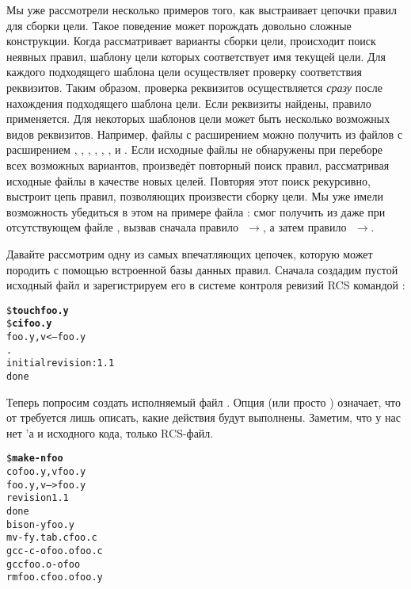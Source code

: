 Мы уже рассмотрели несколько примеров того, как \GNUmake{} выстраивает
цепочки правил для сборки цели. Такое поведение может порождать
довольно сложные конструкции. Когда \GNUmake{} рассматривает варианты
сборки цели, происходит поиск неявных правил, шаблону цели которых
соответствует имя текущей цели. Для каждого подходящего шаблона цели
\GNUmake{} осуществляет проверку соответствия реквизитов. Таким
образом, проверка реквизитов осуществляется \emph{сразу} после
нахождения подходящего шаблона цели. Если реквизиты найдены, правило
применяется. Для некоторых шаблонов цели может быть несколько
возможных видов реквизитов. Например, файлы с расширением
 можно получить из файлов с расширением ,
, , , ,
,  и . Если исходные файлы не
обнаружены при переборе всех возможных вариантов, \GNUmake{}
произведёт повторный поиск правил, рассматривая исходные файлы в
качестве новых целей. Повторяя этот поиск рекурсивно, \GNUmake{}
выстроит цепь правил, позволяющих произвести сборку цели. Мы уже имели
возможность убедиться в этом на примере файла :
\GNUmake{} смог получить  из  даже
при отсутствующем файле , вызвав сначала правило
$\,\,\rightarrow{}$, а затем правило
$\,\,\rightarrow{}$.

Давайте рассмотрим одну из самых впечатляющих цепочек, которую
\GNUmake{} может породить с помощью встроенной базы данных правил.
Сначала создадим пустой исходный файл  и зарегистрируем
его в системе контроля ревизий RCS командой :

\begin{alltt}
\footnotesize
\$ \textbf{touch foo.y}
\$ \textbf{ci foo.y}
foo.y,v  <--  foo.y
.
initial revision: 1.1
done
\end{alltt}

Теперь попросим \GNUmake{} создать исполняемый файл .
Опция  (или просто )
означает, что от \GNUmake{} требуется лишь описать, какие действия
будут выполнены.  Заметим, что у нас нет \Makefile{}'а и исходного
кода, только RCS-файл.

\begin{alltt}
\footnotesize
\$ \textbf{make -n foo}
co  foo.y,v foo.y
foo.y,v  -->  foo.y
revision 1.1
done
bison -y  foo.y
mv -f y.tab.c foo.c
gcc -c -o foo.o foo.c
gcc foo.o -o foo
rm foo.c foo.o foo.y
\end{alltt}


